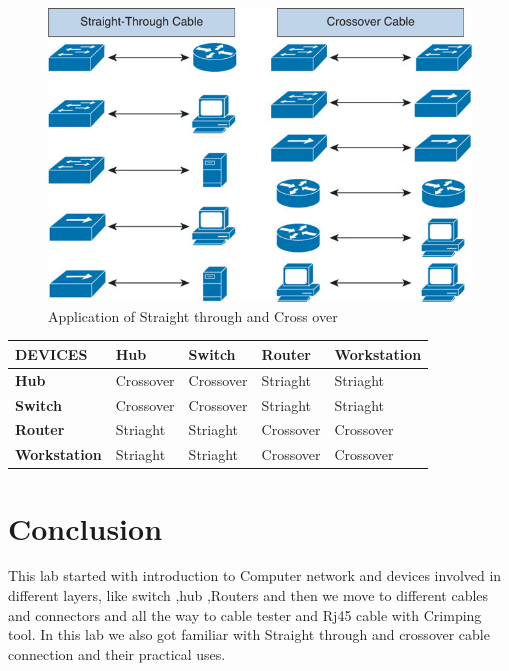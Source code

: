 \documentclass[a4paper,12pt]{article}
\begin{document}
\begin{A}
{         \begin{figure}[H]
            \centering
            \includegraphics[scale=0.6,cframe=blue 0.5pt 3pt]{Choose-Straight-Through-or-Crossover-Cable.jpg}
            \caption{Application of Straight through and  Cross over}
        \end{figure}

        \begin{table}[H]
            \begin{tabular}{|l|l|l|l|l|}
            \hline
            \textbf{DEVICES}                         & \textbf{Hub} & \textbf{Switch} & \textbf{Router} & \textbf{Workstation} \\ \hline
            \textbf{Hub}         & Crossover               & Crossover                  & Striaght                   & Striaght                        \\ \hline
            \textbf{Switch}      & Crossover               & Crossover                  & Striaght                   & Striaght                        \\ \hline
            \textbf{Router}      & Striaght                & Striaght                   & Crossover                  & Crossover                       \\ \hline
            \textbf{Workstation} & Striaght                & Striaght                   & Crossover                  & Crossover                       \\ \hline
            \end{tabular}
        \end{table}
}
\end{A}





\section{Conclusion}
This lab started with introduction to Computer network and devices involved in different layers,
like switch ,hub ,Routers and then we move to different cables and connectors and all the way to cable tester and  Rj45 cable with Crimping tool.
In this lab we also got familiar with  Straight through  and crossover cable connection and their practical uses.
\end{document}
